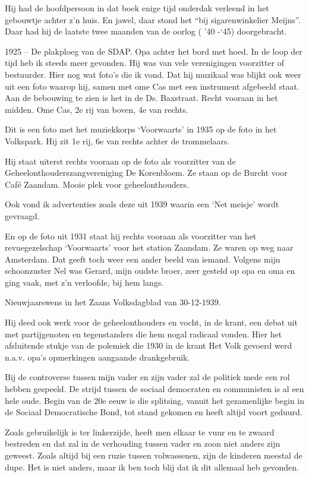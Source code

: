 \documentclass[10pt,twoside,openright]{memoir}
\begin{document}
Hij had de hoofdpersoon in dat boek enige tijd onderdak verleend in het gebouwtje achter z’n huis. En jawel, daar stond het “bij sigarenwinkelier Meijns”. Daar had hij de laatste twee maanden van de oorlog ( ’40 -‘45) doorgebracht.

1925 – De plakploeg van de SDAP. Opa achter het bord met hoed.
In de loop der tijd heb ik steeds meer gevonden. Hij was van vele verenigingen voorzitter of bestuurder. Hier nog wat foto’s die ik vond. 
Dat hij muzikaal was blijkt ook weer uit een foto waarop hij, samen met ome Cas met een instrument afgebeeld staat. Aan de bebouwing te zien is het in de Ds. Baxstraat. Recht vooraan in het midden. Ome Cas, 2e rij van boven, 4e van rechts. 

Dit is een foto met het muziekkorps ‘Voorwaarts’ in 1935 op de foto in het Volkspark. Hij zit 1e rij, 6e van rechts achter de trommelaars.

Hij staat uiterst rechts vooraan op de foto als voorzitter van de Geheelonthouderszangvereniging De Korenbloem. Ze staan op de Burcht voor Café Zaandam. Mooie plek voor geheelonthouders.

Ook vond ik advertenties zoals deze uit 1939 waarin 
een ‘Net meisje’ wordt gevraagd.

En op de foto uit 1931 staat hij rechts vooraan als voorzitter van het revuegezelschap ‘Voorwaarts’ voor het station Zaandam. Ze waren op weg naar Amsterdam. Dat geeft toch weer een ander beeld van iemand. Volgens mijn schoonzuster Nel was Gerard, mijn oudste broer, zeer gesteld op opa en oma en ging vaak, met z’n verloofde, bij hem langs. 

Nieuwjaarswens in het Zaans Volksdagblad van 30-12-1939.

Hij deed ook werk voor de geheelonthouders en vocht, in de krant, een debat uit met partijgenoten en tegenstanders die hem nogal radicaal vonden. Hier het afsluitende stukje van de polemiek die 1930 in de krant Het Volk gevoerd werd n.a.v. opa’s opmerkingen aangaande drankgebruik. 

Bij de controverse tussen mijn vader en zijn vader zal de politiek mede een rol hebben gespeeld. De strijd tussen de sociaal democraten en communisten is al een hele oude. Begin van de 20e eeuw is die splitsing, vanuit het gezamenlijke begin in de Sociaal Democratische Bond, tot stand gekomen en heeft altijd voort geduurd. 

Zoals gebruikelijk is ter linkerzijde, heeft men elkaar te vuur en te zwaard bestreden en dat zal in de verhouding tussen vader en zoon niet anders zijn geweest. Zoals altijd bij een ruzie tussen volwassenen, zijn de kinderen meestal de dupe. Het is niet anders, maar ik ben toch blij dat ik dit allemaal heb gevonden.
\end{document}
